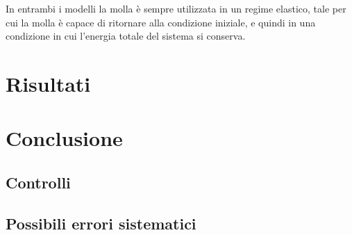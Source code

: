 \documentclass[italian, a4paper, 10pt, twocolumn]{../../style/lab_unige}
\begin{document}
    In entrambi i modelli la molla è sempre utilizzata in un regime elastico, tale per cui la molla è capace
    di ritornare alla condizione iniziale, e quindi in una condizione in cui l'energia totale del sistema si 
    conserva.

    \section{Risultati}
    \label{section:results}

    \section{Conclusione}
    \label{section:conclusion}

    \subsection{Controlli}

    \subsection{Possibili errori sistematici}
    
\end{document}
